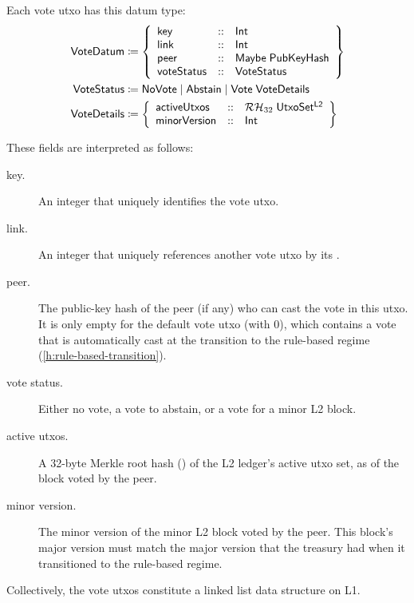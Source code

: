 \documentclass[../hydrozoa.tex]{subfiles}
\begin{document}
Each vote utxo has this datum type:
\begin{equation*}
\begin{split}
  \mathsf{VoteDatum} &\coloneq \left\{
    \begin{array}{lll}
      \mathsf{key}  &::& \mathsf{Int} \\
      \mathsf{link} &::& \mathsf{Int} \\
      \mathsf{peer} &::& \mathsf{Maybe} \; \mathsf{PubKeyHash} \\
      \mathsf{voteStatus} &::& \mathsf{VoteStatus}
    \end{array}\right\}\\
  \mathsf{VoteStatus} &\coloneq \mathsf{NoVote} \mid \mathsf{Abstain} \mid \mathsf{Vote} \; \mathsf{VoteDetails} \\
  \mathsf{VoteDetails} &\coloneq \left\{
    \begin{array}{lll}
      \mathsf{activeUtxos} &::& \mathcal{RH}_{32} \; \mathsf{UtxoSet^{L2}} \\
      \mathsf{minorVersion} &::& \mathsf{Int}
    \end{array}\right\}
\end{split}
\end{equation*}

These fields are interpreted as follows:
\begin{description}
  \item[key.] An integer that uniquely identifies the vote utxo.
  \item[link.] An integer that uniquely references another vote utxo by its .
  \item[peer.] The public-key hash of the peer (if any) who can cast the vote in this utxo. It is only empty for the default vote utxo (with  0), which contains a vote that is automatically cast at the transition to the rule-based regime (\cref{h:rule-based-transition}).
  \item[vote status.] Either no vote, a vote to abstain, or a vote for a minor L2 block.
  \item[active utxos.] A 32-byte Merkle root hash () of the L2 ledger's active utxo set, as of the block voted by the peer.
  \item[minor version.] The minor version of the minor L2 block voted by the peer. This block's major version must match the major version that the treasury had when it transitioned to the rule-based regime.
\end{description}

Collectively, the vote utxos constitute a linked list data structure on L1.
\end{document}
